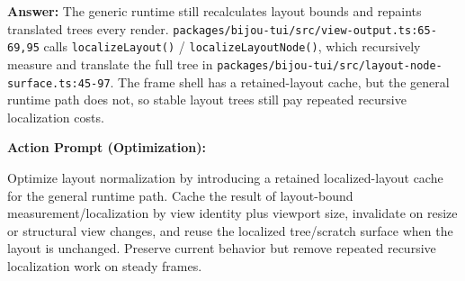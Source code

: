 \textbf{Answer:} The generic runtime still recalculates layout bounds and repaints translated trees every render. \texttt{p\allowbreak{}a\allowbreak{}c\allowbreak{}k\allowbreak{}a\allowbreak{}g\allowbreak{}e\allowbreak{}s\allowbreak{}/\allowbreak{}b\allowbreak{}i\allowbreak{}j\allowbreak{}o\allowbreak{}u\allowbreak{}-\allowbreak{}t\allowbreak{}u\allowbreak{}i\allowbreak{}/\allowbreak{}s\allowbreak{}r\allowbreak{}c\allowbreak{}/\allowbreak{}v\allowbreak{}i\allowbreak{}e\allowbreak{}w\allowbreak{}-\allowbreak{}o\allowbreak{}u\allowbreak{}t\allowbreak{}p\allowbreak{}u\allowbreak{}t\allowbreak{}.\allowbreak{}t\allowbreak{}s\allowbreak{}:\allowbreak{}6\allowbreak{}5\allowbreak{}-\allowbreak{}6\allowbreak{}9\allowbreak{},\allowbreak{}9\allowbreak{}5} calls \texttt{l\allowbreak{}o\allowbreak{}c\allowbreak{}a\allowbreak{}l\allowbreak{}i\allowbreak{}z\allowbreak{}e\allowbreak{}L\allowbreak{}a\allowbreak{}y\allowbreak{}o\allowbreak{}u\allowbreak{}t\allowbreak{}(\allowbreak{})} / \texttt{l\allowbreak{}o\allowbreak{}c\allowbreak{}a\allowbreak{}l\allowbreak{}i\allowbreak{}z\allowbreak{}e\allowbreak{}L\allowbreak{}a\allowbreak{}y\allowbreak{}o\allowbreak{}u\allowbreak{}t\allowbreak{}N\allowbreak{}o\allowbreak{}d\allowbreak{}e\allowbreak{}(\allowbreak{})}, which recursively measure and translate the full tree in \texttt{p\allowbreak{}a\allowbreak{}c\allowbreak{}k\allowbreak{}a\allowbreak{}g\allowbreak{}e\allowbreak{}s\allowbreak{}/\allowbreak{}b\allowbreak{}i\allowbreak{}j\allowbreak{}o\allowbreak{}u\allowbreak{}-\allowbreak{}t\allowbreak{}u\allowbreak{}i\allowbreak{}/\allowbreak{}s\allowbreak{}r\allowbreak{}c\allowbreak{}/\allowbreak{}l\allowbreak{}a\allowbreak{}y\allowbreak{}o\allowbreak{}u\allowbreak{}t\allowbreak{}-\allowbreak{}n\allowbreak{}o\allowbreak{}d\allowbreak{}e\allowbreak{}-\allowbreak{}s\allowbreak{}u\allowbreak{}r\allowbreak{}f\allowbreak{}a\allowbreak{}c\allowbreak{}e\allowbreak{}.\allowbreak{}t\allowbreak{}s\allowbreak{}:\allowbreak{}4\allowbreak{}5\allowbreak{}-\allowbreak{}9\allowbreak{}7}. The frame shell has a retained-layout cache, but the general runtime path does not, so stable layout trees still pay repeated recursive localization costs.

\textbf{Action Prompt (Optimization):}

\begin{CodeBlock}
Optimize layout normalization by introducing a retained localized-layout cache for the general runtime path. Cache the result of layout-bound measurement/localization by view identity plus viewport size, invalidate on resize or structural view changes, and reuse the localized tree/scratch surface when the layout is unchanged. Preserve current behavior but remove repeated recursive localization work on steady frames.
\end{CodeBlock}

